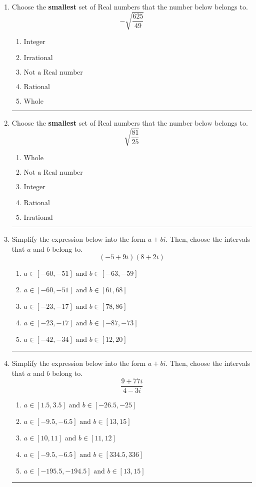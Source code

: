 \documentclass[14pt]{extbook}
\newcommand{\litem}[1]{\item#1\hspace*{-1cm}\rule{\textwidth}{0.4pt}}
\begin{document}
\begin{enumerate}
\litem{
Choose the \textbf{smallest} set of Real numbers that the number below belongs to.\[ -\sqrt{\frac{625}{49}} \]\begin{enumerate}[label=\Alph*.]
\item \( \text{Integer} \)
\item \( \text{Irrational} \)
\item \( \text{Not a Real number} \)
\item \( \text{Rational} \)
\item \( \text{Whole} \)

\end{enumerate} }
\litem{
Choose the \textbf{smallest} set of Real numbers that the number below belongs to.\[ \sqrt{\frac{81}{25}} \]\begin{enumerate}[label=\Alph*.]
\item \( \text{Whole} \)
\item \( \text{Not a Real number} \)
\item \( \text{Integer} \)
\item \( \text{Rational} \)
\item \( \text{Irrational} \)

\end{enumerate} }
\litem{
Simplify the expression below into the form $a+bi$. Then, choose the intervals that $a$ and $b$ belong to.\[ (-5 + 9 i)(8 + 2 i) \]\begin{enumerate}[label=\Alph*.]
\item \( a \in [-60, -51] \text{ and } b \in [-63, -59] \)
\item \( a \in [-60, -51] \text{ and } b \in [61, 68] \)
\item \( a \in [-23, -17] \text{ and } b \in [78, 86] \)
\item \( a \in [-23, -17] \text{ and } b \in [-87, -73] \)
\item \( a \in [-42, -34] \text{ and } b \in [12, 20] \)

\end{enumerate} }
\litem{
Simplify the expression below into the form $a+bi$. Then, choose the intervals that $a$ and $b$ belong to.\[ \frac{9 + 77 i}{4 - 3 i} \]\begin{enumerate}[label=\Alph*.]
\item \( a \in [1.5, 3.5] \text{ and } b \in [-26.5, -25] \)
\item \( a \in [-9.5, -6.5] \text{ and } b \in [13, 15] \)
\item \( a \in [10, 11] \text{ and } b \in [11, 12] \)
\item \( a \in [-9.5, -6.5] \text{ and } b \in [334.5, 336] \)
\item \( a \in [-195.5, -194.5] \text{ and } b \in [13, 15] \)


\end{enumerate}}
\end{enumerate}
\end{document}
